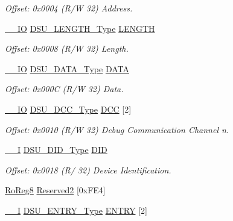 \begin{DoxyCompactItemize}
\begin{DoxyCompactList}\small\item\em Offset\+: 0x0004 (R/W 32) Address. \end{DoxyCompactList}\item 
\mbox{\hyperlink{core__cm0plus_8h_aec43007d9998a0a0e01faede4133d6be}{\+\_\+\+\_\+\+IO}} \mbox{\hyperlink{union_d_s_u___l_e_n_g_t_h___type}{D\+S\+U\+\_\+\+L\+E\+N\+G\+T\+H\+\_\+\+Type}} \mbox{\hyperlink{struct_dsu_aaa78c033db4ceb4d96c4250f684ef718}{L\+E\+N\+G\+TH}}
\begin{DoxyCompactList}\small\item\em Offset\+: 0x0008 (R/W 32) Length. \end{DoxyCompactList}\item 
\mbox{\hyperlink{core__cm0plus_8h_aec43007d9998a0a0e01faede4133d6be}{\+\_\+\+\_\+\+IO}} \mbox{\hyperlink{union_d_s_u___d_a_t_a___type}{D\+S\+U\+\_\+\+D\+A\+T\+A\+\_\+\+Type}} \mbox{\hyperlink{struct_dsu_a5115b1876ae515f5d88ce5f9f871b66f}{D\+A\+TA}}
\begin{DoxyCompactList}\small\item\em Offset\+: 0x000C (R/W 32) Data. \end{DoxyCompactList}\item 
\mbox{\hyperlink{core__cm0plus_8h_aec43007d9998a0a0e01faede4133d6be}{\+\_\+\+\_\+\+IO}} \mbox{\hyperlink{union_d_s_u___d_c_c___type}{D\+S\+U\+\_\+\+D\+C\+C\+\_\+\+Type}} \mbox{\hyperlink{struct_dsu_a787f4c37b8d5b7a47e6603f6b30835d7}{D\+CC}} \mbox{[}2\mbox{]}
\begin{DoxyCompactList}\small\item\em Offset\+: 0x0010 (R/W 32) Debug Communication Channel n. \end{DoxyCompactList}\item 
\mbox{\hyperlink{core__cm0plus_8h_af63697ed9952cc71e1225efe205f6cd3}{\+\_\+\+\_\+I}} \mbox{\hyperlink{union_d_s_u___d_i_d___type}{D\+S\+U\+\_\+\+D\+I\+D\+\_\+\+Type}} \mbox{\hyperlink{struct_dsu_ad7c28a7eefa6630982dd18f09c7bbd32}{D\+ID}}
\begin{DoxyCompactList}\small\item\em Offset\+: 0x0018 (R/ 32) Device Identification. \end{DoxyCompactList}\item 
\mbox{\hyperlink{group___s_a_m_d21_e15_a__definitions_ga0d957f1433aaf5d70e4dc2b68288442d}{Ro\+Reg8}} \mbox{\hyperlink{struct_dsu_ae2c627271321519d2066182e6b83317b}{Reserved2}} \mbox{[}0x\+F\+E4\mbox{]}
\item 
\mbox{\hyperlink{core__cm0plus_8h_af63697ed9952cc71e1225efe205f6cd3}{\+\_\+\+\_\+I}} \mbox{\hyperlink{union_d_s_u___e_n_t_r_y___type}{D\+S\+U\+\_\+\+E\+N\+T\+R\+Y\+\_\+\+Type}} \mbox{\hyperlink{struct_dsu_ace4c71db0b7538ce5f07c40883d54a8c}{E\+N\+T\+RY}} \mbox{[}2\mbox{]}

\end{DoxyCompactItemize}
